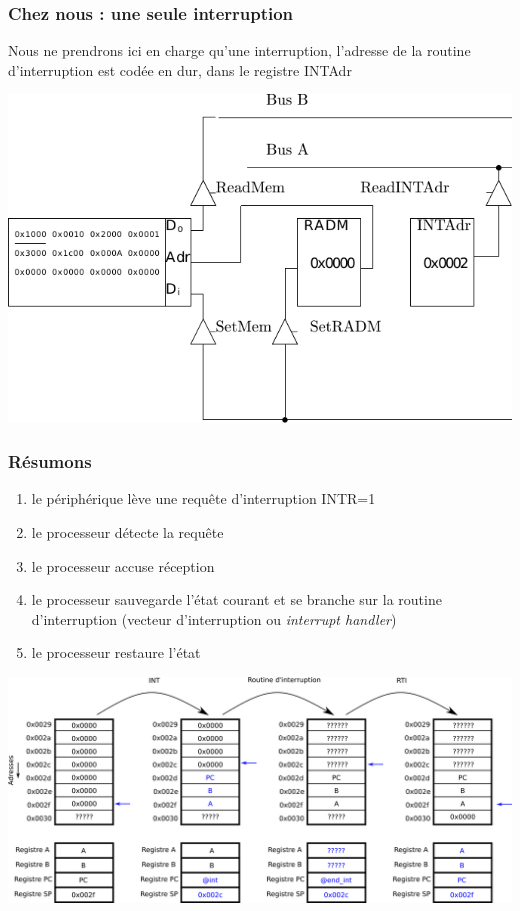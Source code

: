 \documentclass{beamer}
\begin{document}
\begin{frame}
\frametitle{Chez nous : une seule interruption}

Nous ne prendrons ici en charge qu'une interruption, l'adresse de la routine d'interruption est codée en dur, dans le registre INTAdr

\centering\includegraphics[width=0.7\linewidth]{Figs/intadr.pdf}

\end{frame}

\begin{frame}
\frametitle{Résumons}

\begin{small}
\begin{enumerate}
\item le périphérique lève une requête d'interruption INTR=1
\item le processeur détecte la requête
\item le processeur accuse réception
\item le processeur sauvegarde l'état courant et se branche sur la routine d'interruption (vecteur d'interruption ou \emph{interrupt handler})
\item le processeur restaure l'état
\end{enumerate}
\end{small}

\centering\includegraphics[width=0.7\linewidth]{Figs/irq.png}

\end{frame}
\end{document}
